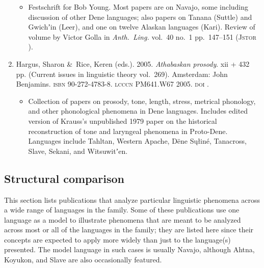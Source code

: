\documentclass[12pt,letterpaper,oneside,article]{memoir}
\begin{document}
\begin{enumerate}
\begin{itemize}
	\item	Festschrift for Bob Young.
		Most papers are on Navajo, some including discussion of other Dene languages;
		also papers on Tanana (Suttle) and Gwichʼin (Leer), and one on
		twelve Alaskan languages (Kari).
		Review of volume by Victor Golla in \textit{Anth.\ Ling.}
		vol.\ 40 no.\ 1 pp.\ 147–151 (\textsc{Jstor} ).
	\end{itemize}
\item	Hargus, Sharon \&\ Rice, Keren (eds.).
	2005.
	\textit{Athabaskan prosody}.
	xii + 432 pp.
	(Current issues in linguistic theory vol.\ 269).
	Amsterdam: John Benjamins.
	\textsc{isbn} 90-272-4783-8.
	\textsc{lcccn} PM641.W67 2005.
	\textsc{doi} .
	\begin{itemize}
	\item	Collection of papers on prosody, tone, length, stress, metrical phonology,
		and other phonological phenomena in Dene languages.
		Includes edited version of Krauss’s unpublished 1979 paper on the
		historical reconstruction of tone and laryngeal phenomena in Proto-Dene.
		Languages include Tahltan, Western Apache, Dëne Sųłiné, Tanacross,
		Slave, Sekani, and Witsuwitʼen.
	\end{itemize}
\end{enumerate}

\subsection{Structural comparison}\label{sec:comphist-comp}

This section lists publications that analyze particular linguistic phenomena across a wide range of languages in the family.
Some of these publications use one language as a model to illustrate phenomena that are meant to be analyzed across most or all of the languages in the family; they are listed here since their concepts are expected to apply more widely than just to the language(s) presented.
The model language in such cases is usually Navajo, although Ahtna, Koyukon, and Slave are also occasionally featured.
\end{document}
